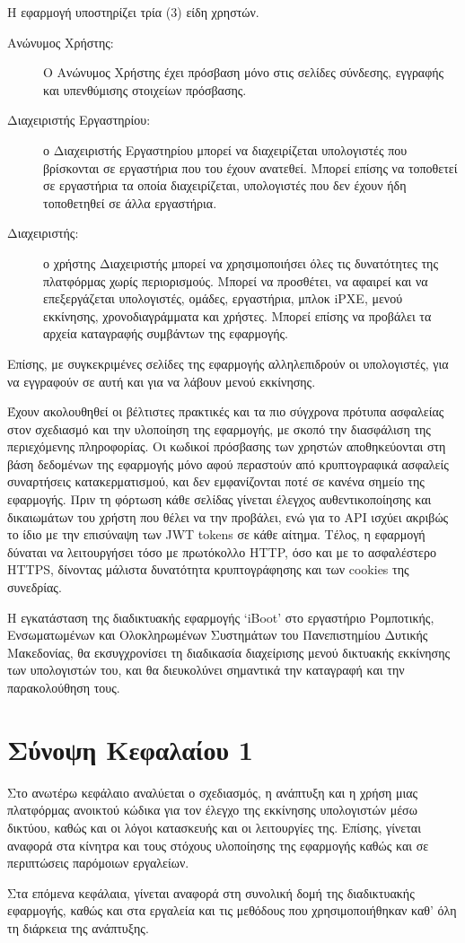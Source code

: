 Η εφαρμογή υποστηρίζει τρία (3) είδη χρηστών.
\begin{description}
	\item[Ανώνυμος Χρήστης:] Ο Ανώνυμος Χρήστης έχει πρόσβαση μόνο στις σελίδες σύνδεσης, εγγραφής και υπενθύμισης στοιχείων πρόσβασης.
	\item[Διαχειριστής Εργαστηρίου:] ο Διαχειριστής Εργαστηρίου μπορεί να διαχειρίζεται υπολογιστές που βρίσκονται σε εργαστήρια που του έχουν ανατεθεί. Μπορεί επίσης να τοποθετεί σε εργαστήρια τα οποία διαχειρίζεται, υπολογιστές που δεν έχουν ήδη τοποθετηθεί σε άλλα εργαστήρια.
	\item[Διαχειριστής: ] ο χρήστης Διαχειριστής μπορεί να χρησιμοποιήσει όλες τις δυνατότητες της πλατφόρμας χωρίς περιορισμούς. Μπορεί να προσθέτει, να αφαιρεί και να επεξεργάζεται υπολογιστές, ομάδες, εργαστήρια, μπλοκ iPXE, μενού εκκίνησης, χρονοδιαγράμματα και χρήστες. Μπορεί επίσης να προβάλει τα αρχεία καταγραφής συμβάντων της εφαρμογής.
\end{description}
Επίσης, με συγκεκριμένες σελίδες της εφαρμογής αλληλεπιδρούν οι υπολογιστές, για να εγγραφούν σε αυτή και για να λάβουν μενού εκκίνησης.

Έχουν ακολουθηθεί οι βέλτιστες πρακτικές και τα πιο σύγχρονα πρότυπα ασφαλείας στον σχεδιασμό και την υλοποίηση της εφαρμογής, με σκοπό την διασφάλιση της περιεχόμενης πληροφορίας. Οι κωδικοί πρόσβασης των χρηστών αποθηκεύονται στη βάση δεδομένων της εφαρμογής μόνο αφού περαστούν από κρυπτογραφικά ασφαλείς συναρτήσεις κατακερματισμού, και δεν εμφανίζονται ποτέ σε κανένα σημείο της εφαρμογής. Πριν τη φόρτωση κάθε σελίδας γίνεται έλεγχος αυθεντικοποίησης και δικαιωμάτων του χρήστη που θέλει να την προβάλει, ενώ για το API ισχύει ακριβώς το ίδιο με την επισύναψη των JWT tokens σε κάθε αίτημα. Τέλος, η εφαρμογή δύναται να λειτουργήσει τόσο με πρωτόκολλο HTTP, όσο και με το ασφαλέστερο HTTPS, δίνοντας μάλιστα δυνατότητα κρυπτογράφησης και των cookies της συνεδρίας.

Η εγκατάσταση της διαδικτυακής εφαρμογής `iBoot' στο εργαστήριο Ρομποτικής, Ενσωματωμένων και Ολοκληρωμένων Συστημάτων του Πανεπιστημίου Δυτικής Μακεδονίας, θα εκσυγχρονίσει τη διαδικασία διαχείρισης μενού δικτυακής εκκίνησης των υπολογιστών του, και θα διευκολύνει σημαντικά την καταγραφή και την παρακολούθηση τους.

\section{Σύνοψη Κεφαλαίου 1}
Στο ανωτέρω κεφάλαιο αναλύεται ο σχεδιασμός, η ανάπτυξη και η χρήση μιας πλατφόρμας ανοικτού κώδικα για τον έλεγχο της εκκίνησης υπολογιστών μέσω δικτύου, καθώς και οι λόγοι κατασκευής και οι λειτουργίες της. Επίσης, γίνεται αναφορά στα κίνητρα και τους στόχους υλοποίησης της εφαρμογής καθώς και σε περιπτώσεις παρόμοιων εργαλείων.

Στα επόμενα κεφάλαια, γίνεται αναφορά στη συνολική δομή της διαδικτυακής εφαρμογής, καθώς και στα εργαλεία και τις μεθόδους που χρησιμοποιήθηκαν καθ' όλη τη διάρκεια της ανάπτυξης.
